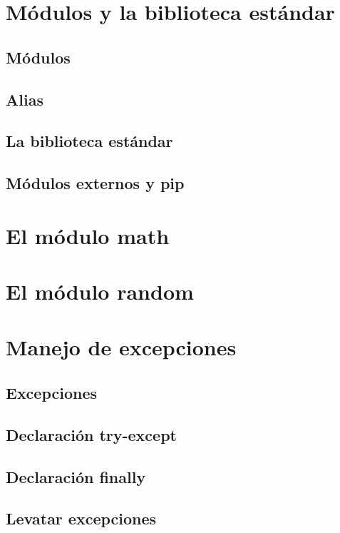 \documentclass{article}
\begin{document}
\section{Módulos y la biblioteca estándar}

\subsection{Módulos}

\subsection{Alias}

\subsection{La biblioteca estándar}

\subsection{Módulos externos y pip}

\section{El módulo math}

\section{El módulo random}

\section{Manejo de excepciones}

\subsection{Excepciones}

\subsection{Declaración try-except}

\subsection{Declaración finally}

\subsection{Levatar excepciones}
\end{document}
